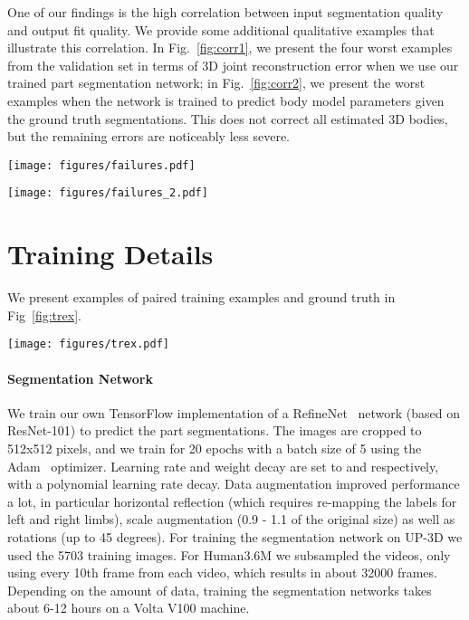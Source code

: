 \documentclass[10pt,twocolumn,letterpaper]{article}
\begin{document}
One of our findings is the high correlation between input segmentation
quality and output fit quality. We provide some additional qualitative examples that
illustrate this correlation. In Fig.~\ref{fig:corr1}, we present the four worst examples from the
validation set in terms of 3D joint reconstruction error when we use our trained
part segmentation network; in Fig.~\ref{fig:corr2}, we present the worst examples when the
network is trained to predict body model parameters given the ground truth
segmentations. This does not correct all estimated 3D bodies, but the
remaining errors are noticeably less severe.

\begin{figure*}[t]
\caption{Worst examples from the validation set in terms of 3D error given imperfect segmentations.}
\label{fig:corr1}
\texttt{[image: figures/failures.pdf]}
\end{figure*}

\begin{figure*}[t]
\caption{Worst examples from the validation set in terms of 3D error given perfect segmentations.}
\label{fig:corr2}
\texttt{[image: figures/failures\_2.pdf]}
\end{figure*}

\section{Training Details}

We present examples of paired training examples and ground truth in Fig~\ref{fig:trex}.

\begin{figure*}[t]
\caption{Example training images annotations illustrating different types and granularities.}
\label{fig:trex}
\texttt{[image: figures/trex.pdf]}
\end{figure*}
\vspace{-0.5em}
\paragraph{Segmentation Network} We train our own TensorFlow implementation of a RefineNet~ network
(based on ResNet-101) to predict the part segmentations.
The images are cropped to 512x512 pixels, and we train for 20 epochs with a batch size 
of 5 using the Adam~ optimizer. Learning rate and weight decay are set 
to  and  respectively, with a polynomial learning rate decay. 
Data augmentation improved performance a lot, in particular horizontal 
reflection (which requires re-mapping the labels for left and right limbs), 
scale augmentation (0.9 - 1.1 of the original size) as well as rotations (up to 45 degrees). 
For training the segmentation network on UP-3D we used the 5703 training images. For Human3.6M we subsampled the videos, 
only using every 10th frame from each video, which results in about 32000 frames. 
Depending on the amount of data, training the segmentation networks takes about 6-12 hours on a Volta V100 machine.
\vspace{-0.5em}
\end{document}
